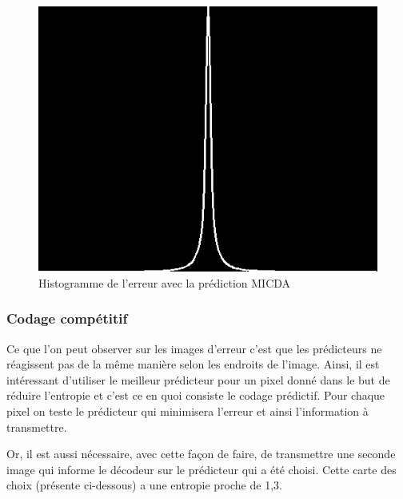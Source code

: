 \documentclass[12pt]{report}
\begin{document}
\begin{figure}[H]
\begin{center}
\includegraphics[scale=0.4]{../ImageRes/HistogrammeErreurMICDAQ1.jpg} 
\caption{Histogramme de l'erreur avec la prédiction MICDA}
\end{center}
\end{figure}

\subsubsection{Codage compétitif}

Ce que l'on peut observer sur les images d'erreur c'est que les prédicteurs ne réagissent pas de la même manière selon les endroits de l'image. Ainsi, il est intéressant d'utiliser le meilleur prédicteur pour un pixel donné dans le but de réduire l'entropie et c'est ce en quoi consiste le codage prédictif. Pour chaque pixel on teste le prédicteur qui minimisera l'erreur et ainsi l'information à transmettre.

Or, il est aussi nécessaire, avec cette façon de faire, de transmettre une seconde image qui informe le décodeur sur le prédicteur qui a été choisi. Cette carte des choix (présente ci-dessous) a une entropie proche de 1,3.
\end{document}
